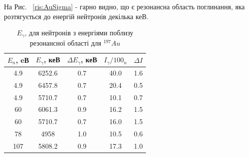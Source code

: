 \documentclass[a4paper, 14pt]{article}
\numberwithin{equation}{section}
\numberwithin{table}{section}
\begin{document}
На Рис. ~\ref{ris:AuSigma} - гарно видно, що є резонансна область поглинання, яка розтягується до енергій нейтронів декілька кеВ. 
\begin{table}[h]
	\centering
	\caption{$E_\gamma$, для нейтронів з енергіями поблизу резонансної області для $^{197}Au$} 
	\begin{tabular}{|c|c|c|c|c|} 
		\hline
		$E_{n}$, eВ&$E_{\gamma}$, кеВ & $\Delta{E_{\gamma}}$, кеВ & $I_{\gamma} / 100_n$ & $\Delta{I}$ \\
		\hline
		4.9 & 6252.6 & 0.7 & 40.0 & 1.6 \\
		\hline
		4.9 & 6457.8 & 0.7 & 20.4 & 0.5\\	
		\hline
		4.9 & 5710.7 & 0.7 & 10.1 & 0.7 \\	
		\hline	%
		60 & 6061.3 & 0.9 & 16.2 & 1.5 \\	
		\hline %
		60 & 5710.7 & 0.7 & 16.0 & 1.5 \\	
		\hline %
		78 & 4958 & 1.0 & 10.5 & 0.6\\	
		\hline%
		107 & 5808.2 & 0.9 & 17.3 & 1.0 \\	
		\hline
	\end{tabular}
	\label{tabl:AuNeutronAbsorption}
\end{table}
\end{document}
